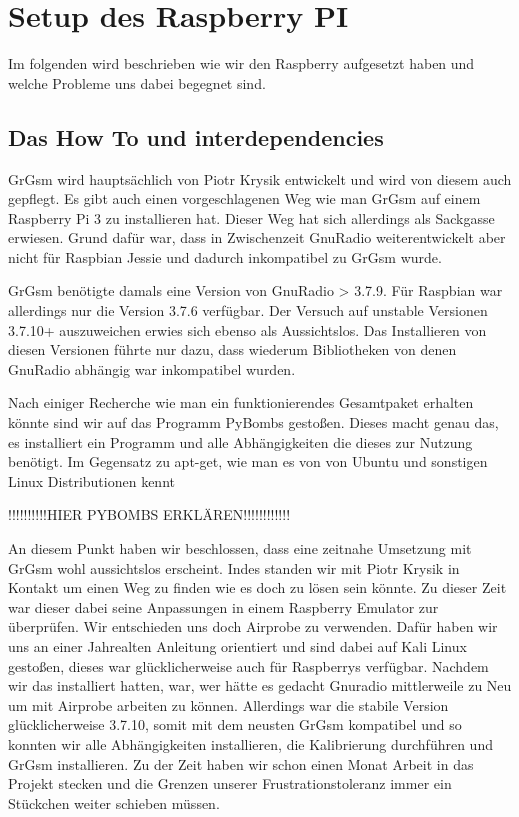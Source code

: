 %
%
\chapter{Setup des Raspberry PI}
Im folgenden wird beschrieben wie wir den Raspberry aufgesetzt haben und welche Probleme uns dabei begegnet sind.
\section{Das How To und interdependencies}

GrGsm wird hauptsächlich von Piotr Krysik entwickelt und wird von diesem auch gepflegt. Es gibt auch einen vorgeschlagenen Weg wie man GrGsm auf einem Raspberry Pi 3 zu installieren hat. Dieser Weg hat sich allerdings als Sackgasse erwiesen. Grund dafür war, dass in Zwischenzeit GnuRadio weiterentwickelt aber nicht für Raspbian Jessie und dadurch inkompatibel zu GrGsm wurde. 


GrGsm benötigte damals eine Version von GnuRadio > 3.7.9. Für Raspbian war allerdings nur die Version 3.7.6 verfügbar. Der Versuch auf unstable Versionen 3.7.10+ auszuweichen erwies sich ebenso als Aussichtslos. Das Installieren von diesen Versionen führte nur dazu, dass wiederum Bibliotheken von denen GnuRadio abhängig war inkompatibel wurden. 

Nach einiger Recherche wie man ein funktionierendes Gesamtpaket erhalten könnte sind wir auf das Programm PyBombs gestoßen. Dieses macht genau das, es installiert ein Programm und alle Abhängigkeiten die dieses zur Nutzung benötigt. Im Gegensatz zu apt-get, wie man es von von Ubuntu und sonstigen Linux Distributionen kennt 

!!!!!!!!!!HIER PYBOMBS ERKLÄREN!!!!!!!!!!!!

An diesem Punkt haben wir beschlossen, dass eine zeitnahe Umsetzung mit GrGsm wohl aussichtslos erscheint. Indes standen wir mit Piotr Krysik in Kontakt um einen Weg zu finden wie es doch zu lösen sein könnte. Zu dieser Zeit war dieser dabei seine Anpassungen in einem Raspberry Emulator zur überprüfen. Wir entschieden uns doch Airprobe zu verwenden. Dafür haben wir uns an einer Jahrealten Anleitung orientiert und sind dabei auf Kali Linux gestoßen, dieses war glücklicherweise auch für Raspberrys verfügbar. Nachdem wir das installiert hatten, war, wer hätte es gedacht Gnuradio mittlerweile zu Neu um mit Airprobe arbeiten zu können. Allerdings war die stabile Version glücklicherweise 3.7.10, somit mit dem neusten GrGsm kompatibel und so konnten wir alle Abhängigkeiten installieren, die Kalibrierung durchführen und GrGsm installieren. Zu der Zeit haben wir schon einen Monat Arbeit in das Projekt stecken und die Grenzen unserer Frustrationstoleranz immer ein Stückchen weiter schieben müssen.

